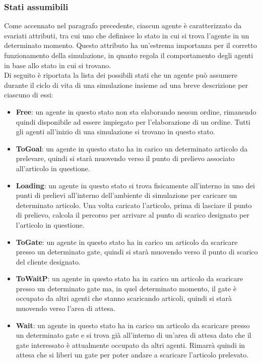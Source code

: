 \documentclass[12pt]{article}
\begin{document}
\subsubsection{Stati assumibili}\label{StatiAssumibili}
Come accennato nel paragrafo precedente, ciascun agente è caratterizzato da svariati attributi, tra cui uno che definisce lo stato in cui si trova l'agente in un determinato momento. Questo attributo ha un'estrema importanza per il corretto funzionamento della simulazione, in quanto regola il comportamento degli agenti in base allo stato in cui si trovano. \\
\noindent Di seguito è riportata la lista dei possibili stati che un agente può assumere durante il ciclo di vita di una simulazione insieme ad una breve descrizione per ciascuno di essi:
\begin{itemize}
    \item \textbf{Free}: un agente in questo stato non sta elaborando nessun ordine, rimanendo quindi disponibile ad essere impiegato per l'elaborazione di un ordine. Tutti gli agenti all'inizio di una simulazione si trovano in questo stato.
    \item \textbf{ToGoal}: un agente in questo stato ha in carico un determinato articolo da prelevare, quindi si starà muovendo verso il punto di prelievo associato all'articolo in questione. 
    \item \textbf{Loading}:  un agente in questo stato si trova fisicamente all'interno in uno dei punti di prelievi all'interno dell'ambiente di simulazione per caricare un determinato articolo. Una volta caricato l'articolo, prima di lasciare il punto di prelievo, calcola il percorso per arrivare al punto di scarico designato per l'articolo in questione.
    \item \textbf{ToGate}: un agente in questo stato ha in carico un articolo da scaricare presso un determinato gate, quindi si starà muovendo verso il punto di scarico del cliente designato.
    \item \textbf{ToWaitP}: un agente in questo stato ha in carico un articolo da scaricare presso un determinato gate ma, in quel determinato momento, il gate è occupato da altri agenti che stanno scaricando articoli, quindi si starà muovendo verso l'area di attesa.
    \item \textbf{Wait}:  un agente in questo stato ha in carico un articolo da scaricare presso un determinato gate e si trova già all'interno di un'area di attesa dato che il gate interessato è attualmente occupato da altri agenti. Rimarrà quindi in attesa che si liberi un gate per poter andare a scaricare l'articolo prelevato.   

\end{itemize}
\end{document}
